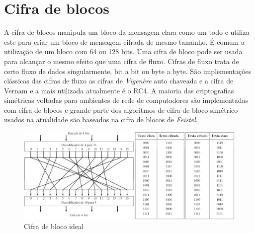 \section{Cifra de blocos}
\label{sec:cifradeblocos}
A cifra de blocos manipula um bloco da mensagem clara como um todo e utiliza este para criar um bloco de mensagem cifrada de mesmo tamanho. É comum a utilização de um bloco com 64 ou 128 bits. Uma cifra de bloco pode ser usada para alcançar o mesmo efeito que uma cifra de fluxo. Cifras de fluxo trata de certo fluxo de dados singularmente, bit a bit ou byte a byte. São implementações clássicas das cifras de fluxo as cifras de \textit{Vigenère} auto chaveada e a cifra de Vernam e a mais utilizada atualmente é o RC4. A maioria das criptografias simétricas voltadas para ambientes de rede de computadores são implementadas com cifra de blocos e grande parte dos algoritmos de cifra de bloco simétrico usados na atualidade são baseados na cifra de blocos de \textit{Feistel}.


\begin{figure}[H]
    \centering
    \caption{Cifra de bloco ideal}
    \label{fig:cifrablocoideal}
    \includegraphics[width=.8\linewidth]{Figuras/CifraDeBloco.png}
\end{figure}


